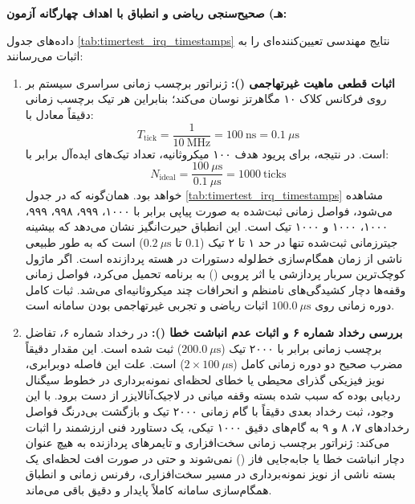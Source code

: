 \vspace{0.4cm}
\noindent
\textbf{هـ) صحیح‌سنجی ریاضی و انطباق با اهداف چهارگانه آزمون:}\par
داده‌های جدول \ref{tab:timertest_irq_timestamps} نتایج مهندسی تعیین‌کننده‌ای را به اثبات می‌رسانند:
\begin{enumerate}
    \item \textbf{اثبات قطعی ماهیت غیرتهاجمی ():}
    ژنراتور برچسب زمانی سراسری سیستم بر روی فرکانس کلاک ۱۰ مگاهرتز نوسان می‌کند؛ بنابراین هر تیک برچسب زمانی دقیقاً معادل با:
    \begin{equation}
    T_{\mathrm{tick}} = \frac{1}{10\ \mathrm{MHz}} = 100\ \mathrm{ns} = 0.1\ \mu\mathrm{s}
    \end{equation}
    است. در نتیجه، برای پریود هدف ۱۰۰ میکروثانیه، تعداد تیک‌های ایده‌آل برابر با:
    \begin{equation}
    N_{\mathrm{ideal}} = \frac{100\ \mu\mathrm{s}}{0.1\ \mu\mathrm{s}} = 1000\ \mathrm{ticks}
    \end{equation}
    خواهد بود. همان‌گونه که در جدول \ref{tab:timertest_irq_timestamps} مشاهده می‌شود، فواصل زمانی ثبت‌شده به صورت پیاپی برابر با ۱۰۰۰، ۹۹۹، ۹۹۸، ۹۹۹، ۱۰۰۰، ۱۰۰۰ و ۱۰۰۰ تیک است. این انطباق حیرت‌انگیز نشان می‌دهد که بیشینه جیترزمانی ثبت‌شده تنها در حد ۱ تا ۲ تیک ($0.1$ تا $0.2\ \mu\mathrm{s}$) است که به طور طبیعی ناشی از زمان همگام‌سازی خط‌لوله دستورات در هسته پردازنده است. اگر ماژول  کوچک‌ترین سربار پردازشی یا اثر پروبی () به برنامه تحمیل می‌کرد، فواصل زمانی وقفه‌ها دچار کشیدگی‌های نامنظم و انحرافات چند میکروثانیه‌ای می‌شد. ثبات کامل دوره زمانی روی $100.0\ \mu\mathrm{s}$ اثبات ریاضی و تجربی غیرتهاجمی بودن سامانه است.

    \item \textbf{بررسی رخداد شماره ۶ و اثبات عدم انباشت خطا ():}
    در رخداد شماره ۶، تفاضل برچسب زمانی برابر با ۲۰۰۰ تیک ($200.0\ \mu\mathrm{s}$) ثبت شده است. این مقدار دقیقاً مضرب صحیح دو دوره زمانی کامل ($2 \times 100\ \mu\mathrm{s}$) است. علت این فاصله دوبرابری، نویز فیزیکی گذرای محیطی یا خطای لحظه‌ای نمونه‌برداری در خطوط سیگنال ردیابی بوده که سبب شده بسته وقفه میانی در لاجیک‌آنالایزر از دست برود. با این وجود، ثبت رخداد بعدی دقیقاً با گام زمانی ۲۰۰۰ تیک و بازگشت بی‌درنگ فواصل رخدادهای ۷، ۸ و ۹ به گام‌های دقیق ۱۰۰۰ تیکی، یک دستاورد فنی ارزشمند را اثبات می‌کند: ژنراتور برچسب زمانی سخت‌افزاری و تایمرهای پردازنده به هیچ عنوان دچار انباشت خطا یا جابه‌جایی فاز () نمی‌شوند و حتی در صورت افت لحظه‌ای یک بسته ناشی از نویز نمونه‌برداری در مسیر سخت‌افزاری، رفرنس زمانی و انطباق همگام‌سازی سامانه کاملاً پایدار و دقیق باقی می‌ماند.


\end{enumerate}
